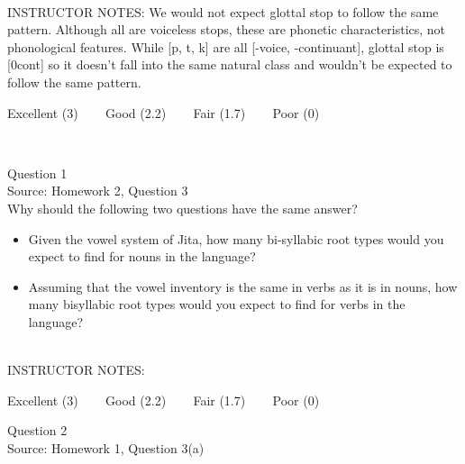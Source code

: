 \documentclass[12pt]{article}
\begin{document}
~\\
INSTRUCTOR NOTES: We would not expect glottal stop to follow the same pattern. Although all are voiceless stops, these are phonetic characteristics, not phonological features. While [p, t, k] are all [-voice, -continuant], glottal stop is [0cont] so it doesn't fall into the same natural class and wouldn't be expected to follow the same pattern.


\vfill
Excellent (3) ~~~ Good (2.2) ~~~ Fair (1.7) ~~~ Poor (0)
\newpage

\begin{center}
\textbf{{\color{red}{\HUGE END OF EXAM}}}\\

\end{center}
\newpage

\begin{center}
\textbf{{\color{blue}{\HUGE START OF EXAM\\}}}

\textbf{{\color{blue}{\HUGE Student ID: 51967\\}}}

\textbf{{\color{blue}{\HUGE 4:10\\}}}

\end{center}
\newpage

{\large Question 1}\\

Source: Homework 2, Question 3\\

Why should the following two questions have the same answer?\\

\begin{itemize} \item Given the vowel system of Jita, how many bi-syllabic root types would you expect to find for nouns in the language? \item Assuming that the vowel inventory is the same in verbs as it is in nouns, how many bisyllabic root types would you expect to find for verbs in the language? \end{itemize}


~\\
INSTRUCTOR NOTES: 


\vfill
Excellent (3) ~~~ Good (2.2) ~~~ Fair (1.7) ~~~ Poor (0)
\newpage

{\large Question 2}\\

Source: Homework 1, Question 3(a)\\
\end{document}

